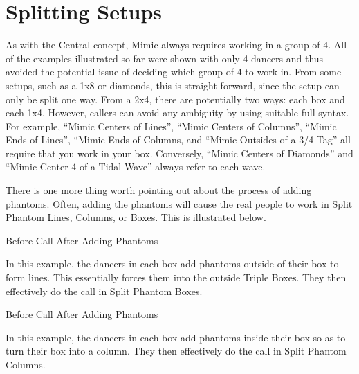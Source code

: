 \documentclass[12pt]{article}
\begin{document}
\section{Splitting Setups}

As with the Central concept, Mimic always requires working in a group of 4.
All of the examples illustrated so far were shown with only 4 dancers
and thus avoided the potential issue of deciding which group of 4 to
work in.  From some setups, such as a 1x8 or diamonds,
this is straight-forward, since the setup can only be split one way.
From a 2x4, there are potentially two ways: each box and each 1x4.
However, callers can avoid any ambiguity by using suitable full syntax.
For example, ``Mimic Centers of Lines'', ``Mimic Centers of Columns'',
``Mimic Ends of Lines'', ``Mimic Ends of Columns, and
``Mimic Outsides of a 3/4 Tag'' all require that you work in your
box.
Conversely, ``Mimic Centers of Diamonds'' and
 ``Mimic Center 4 of a Tidal Wave'' always refer to each wave.

There is one more thing worth pointing out about the process of adding
phantoms.  Often, adding the phantoms will cause the real people to work
in Split Phantom Lines, Columns, or Boxes.  This is illustrated below.

\displaytwo
{\cr
 }
{Before Call}
{
 \cr
 }
{After Adding Phantoms}
\endexample

In this example, the dancers in each box add phantoms outside of their box
to form lines.  This essentially forces them into the outside Triple Boxes.
They then effectively do the call in Split Phantom Boxes.

\displaytwo
{\cr
 }
{Before Call}
{\cr
 \cr
 \cr
 }
{After Adding Phantoms}
\endexample

In this example, the dancers in each box add phantoms inside their box
so as to turn their box into a column.  They then effectively do the
call in Split Phantom Columns.
\end{document}
